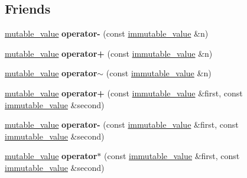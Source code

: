 \subsection*{Friends}
\begin{DoxyCompactItemize}
\item 
\mbox{\label{classdialog_1_1mutable__value_a00adf7bda6ac2a310d53e7ddbe990dc9}} 
\hyperlink{classdialog_1_1mutable__value}{mutable\+\_\+value} {\bfseries operator-\/} (const \hyperlink{classdialog_1_1immutable__value}{immutable\+\_\+value} \&n)
\item 
\mbox{\label{classdialog_1_1mutable__value_a51cec9f0cc1f6416577459cd260e2221}} 
\hyperlink{classdialog_1_1mutable__value}{mutable\+\_\+value} {\bfseries operator+} (const \hyperlink{classdialog_1_1immutable__value}{immutable\+\_\+value} \&n)
\item 
\mbox{\label{classdialog_1_1mutable__value_a2405f68fffcf1bf68a332a9680aa0198}} 
\hyperlink{classdialog_1_1mutable__value}{mutable\+\_\+value} {\bfseries operator$\sim$} (const \hyperlink{classdialog_1_1immutable__value}{immutable\+\_\+value} \&n)
\item 
\mbox{\label{classdialog_1_1mutable__value_a2fe0780b8951e996611809cdf531c8e7}} 
\hyperlink{classdialog_1_1mutable__value}{mutable\+\_\+value} {\bfseries operator+} (const \hyperlink{classdialog_1_1immutable__value}{immutable\+\_\+value} \&first, const \hyperlink{classdialog_1_1immutable__value}{immutable\+\_\+value} \&second)
\item 
\mbox{\label{classdialog_1_1mutable__value_a1c18bc903370d7cee73614a96ec5f067}} 
\hyperlink{classdialog_1_1mutable__value}{mutable\+\_\+value} {\bfseries operator-\/} (const \hyperlink{classdialog_1_1immutable__value}{immutable\+\_\+value} \&first, const \hyperlink{classdialog_1_1immutable__value}{immutable\+\_\+value} \&second)
\item 
\mbox{\label{classdialog_1_1mutable__value_a8a09cfa8690a125b394b1b948b7e13a0}} 
\hyperlink{classdialog_1_1mutable__value}{mutable\+\_\+value} {\bfseries operator$\ast$} (const \hyperlink{classdialog_1_1immutable__value}{immutable\+\_\+value} \&first, const \hyperlink{classdialog_1_1immutable__value}{immutable\+\_\+value} \&second)

\end{DoxyCompactItemize}
